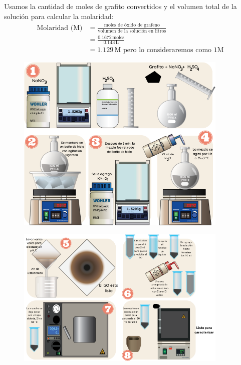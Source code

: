 \documentclass[12pt]{article}
\begin{document}
    Usamos la cantidad de moles de grafito convertidos y el volumen total de la solución para calcular la molaridad:
    \begin{align}
    \text{Molaridad (M)} &= \frac{\text{moles de óxido de grafeno}}{\text{volumen de la solución en litros}} \\
    &= \frac{0.1672 \, \text{moles}}{0.143 \, \text{L}} \\
    &= 1.129\, \text{M pero lo consideraremos como 1M}
    \end{align}


        \begin{figure}[H]
        	\begin{center}
         		\includegraphics[width = 0.9\textwidth]{Imagenes/GO_1.png}
        	\end{center} 
        \end{figure}
         \begin{figure}[H]
        	\begin{center}
         		\includegraphics[width = 0.9\textwidth]{Imagenes/GO_2.png}
        	\end{center} 
        \end{figure}
\end{document}
